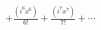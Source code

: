 \documentclass[preview]{standalone}
\begin{document}
\begin{align*}
+ \frac{(i^6x^6)}{6!} + \frac{(i^7x^7)}{7!} + \cdots
\end{align*}
\end{document}

